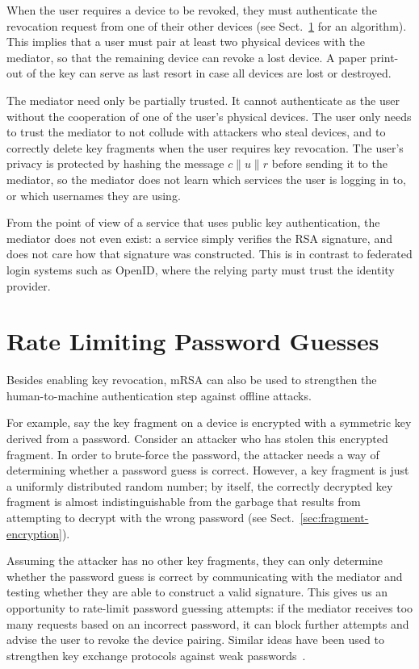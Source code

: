 \documentclass{llncs}
\newcommand*{\concat}{\mathbin{\|}}
\begin{document}
When the user requires a device to be revoked, they must authenticate the revocation request from
one of their other devices (see Sect.~\ref{sec:ratelimit} for an algorithm). This implies that a
user must pair at least two physical devices with the mediator, so that the remaining device can
revoke a lost device. A paper print-out of the key can serve as last resort in case all devices are
lost or destroyed.

The mediator need only be partially trusted. It cannot authenticate as the user without the
cooperation of one of the user's physical devices. The user only needs to trust the mediator to not
collude with attackers who steal devices, and to correctly delete key fragments when the user
requires key revocation. The user's privacy is protected by hashing the message
$c \concat u \concat r$ before sending it to the mediator, so the mediator does not learn which
services the user is logging in to, or which usernames they are using.

From the point of view of a service that uses public key authentication, the mediator does not even
exist: a service simply verifies the RSA signature, and does not care how that
signature was constructed. This is in contrast to federated login systems such as OpenID, where the
relying party must trust the identity provider.

\section{Rate Limiting Password Guesses}\label{sec:ratelimit}

Besides enabling key revocation, mRSA can also be used to strengthen the human-to-machine
authentication step against offline attacks.

For example, say the key fragment on a device is encrypted with a symmetric key derived from a
password. Consider an attacker who has stolen this encrypted fragment. In order to brute-force the
password, the attacker needs a way of determining whether a password guess is correct. However, a
key fragment is just a uniformly distributed random number; by itself, the correctly decrypted key
fragment is almost indistinguishable from the garbage that results from attempting to decrypt with
the wrong password (see Sect.~\ref{sec:fragment-encryption}).

Assuming the attacker has no other key fragments, they can only determine whether the password guess
is correct by communicating with the mediator and testing whether they are able to construct a valid
signature. This gives us an opportunity to rate-limit password guessing attempts: if the mediator
receives too many requests based on an incorrect password, it can block further attempts and advise
the user to revoke the device pairing. Similar ideas have been used to strengthen key exchange
protocols against weak passwords~\cite{Bellovin92}.
\end{document}

